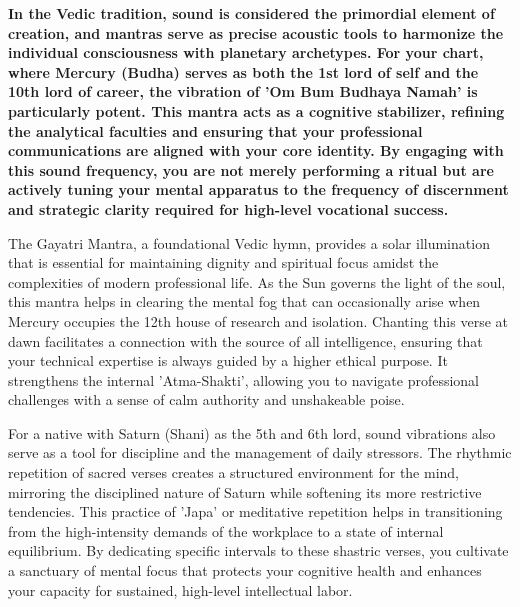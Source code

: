 {\fontsize{9.5}{13.8}\selectfont\bfseries\color{DeepSlate} In the Vedic tradition, sound is considered the primordial element of creation, and mantras serve as precise acoustic tools to harmonize the individual consciousness with planetary archetypes. For your chart, where Mercury (Budha) serves as both the 1st lord of self and the 10th lord of career, the vibration of 'Om Bum Budhaya Namah' is particularly potent. This mantra acts as a cognitive stabilizer, refining the analytical faculties and ensuring that your professional communications are aligned with your core identity. By engaging with this sound frequency, you are not merely performing a ritual but are actively tuning your mental apparatus to the frequency of discernment and strategic clarity required for high-level vocational success.}\par\vspace{2mm}

{\fontsize{9}{13}\selectfont The Gayatri Mantra, a foundational Vedic hymn, provides a solar illumination that is essential for maintaining dignity and spiritual focus amidst the complexities of modern professional life. As the Sun governs the light of the soul, this mantra helps in clearing the mental fog that can occasionally arise when Mercury occupies the 12th house of research and isolation. Chanting this verse at dawn facilitates a connection with the source of all intelligence, ensuring that your technical expertise is always guided by a higher ethical purpose. It strengthens the internal 'Atma-Shakti', allowing you to navigate professional challenges with a sense of calm authority and unshakeable poise.}\par\vspace{1.8mm}

{\fontsize{9}{13}\selectfont For a native with Saturn (Shani) as the 5th and 6th lord, sound vibrations also serve as a tool for discipline and the management of daily stressors. The rhythmic repetition of sacred verses creates a structured environment for the mind, mirroring the disciplined nature of Saturn while softening its more restrictive tendencies. This practice of 'Japa' or meditative repetition helps in transitioning from the high-intensity demands of the workplace to a state of internal equilibrium. By dedicating specific intervals to these shastric verses, you cultivate a sanctuary of mental focus that protects your cognitive health and enhances your capacity for sustained, high-level intellectual labor.}\par\vspace{1.8mm}

